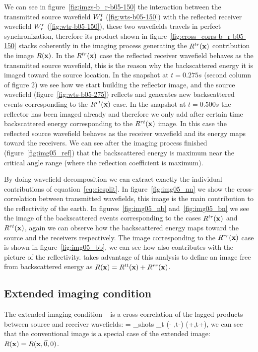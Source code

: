 We can see in figure~\ref{fig:imgs-b_r-b05-150} the interaction between the transmitted source wavefield ${W_s^t}$ (\ref{fig:wts-b05-150}) with 
the reflected receiver wavefield ${W_r^r}$ (\ref{fig:wtr-b05-150}), these two wavefields travels in perfect synchronization, therefore its product 
shown in figure~\ref{fig:cross_corrs-b_r-b05-150} stacks coherently in the imaging process generating the $R^{tr}({\bf x})$ 
contribution the image $R({\bf x})$. In the $R^{tr}({\bf x})$ case the reflected 
receiver wavefield behaves as the transmitted source wavefield, this is the reason why the backscattered energy 
it is imaged toward the source location. 
In the snapshot at $t=0.275s$ (second column of figure 2) we see how we start building the reflector image,
 and the source wavefield (figure~\ref{fig:wts-b05-275}) reflects and generates new backscattered events
 corresponding to the  $R^{rt}({\bf x})$ case. In the snapshot at $t=0.500s$ the reflector has been imaged already and 
therefore we only add after certain time backscattered energy corresponding to the $R^{rt}({\bf x})$ image. In this case the 
reflected source wavefield behaves as the receiver wavefield and its energy maps toward the receivers. We can see after
 the imaging process finished (figure~\ref{fig:img05_ref}) that the backscattered energy is maximum near the critical
 angle range (where the reflection coefficient is maximum).

By doing wavefield decomposition we can extract exactly the individual contributions of equation~\ref{eq:cicsplit}. In 
figure~\ref{fig:img05_nn} we show the cross-correlation between transmitted wavefields, this image is the main contribution
to the reflectivity of the earth. In figures~\ref{fig:img05_nb} and~\ref{fig:img05_bn} we see the image of the backscattered
events corresponding to the cases $R^{tr}({\bf x})$ and $R^{rt}({\bf x})$, again we can observe how the backscattered energy
maps toward the source and the receivers respectively. The image corresponding to the $R^{rr}({\bf x})$ case is shown in 
figure~\ref{fig:img05_bb}, we can see how also contributes with the picture of the reflectivity. \cite{fei:3130} takes 
advantage of this analysis to define an image free from backscattered energy as $R({\bf x})=R^{tt}({\bf x})+R^{rr}({\bf x})$.

\subsection{Extended imaging condition}

The extended imaging condition ~\citep{sava:S209} is a cross-correlation of the lagged products between source
and receiver wavefields:
\beq
\Re= \sum_{shots} \sum_{t} \US(\xx - \hh,t-\tau) \UR(\xx+\hh,t+\tau),
\label{eq:eic}
\eeq
we can see that the conventional image is a special case of the extended image: $R({\bf x})=R({\bf x},\vec{0},0)$.

